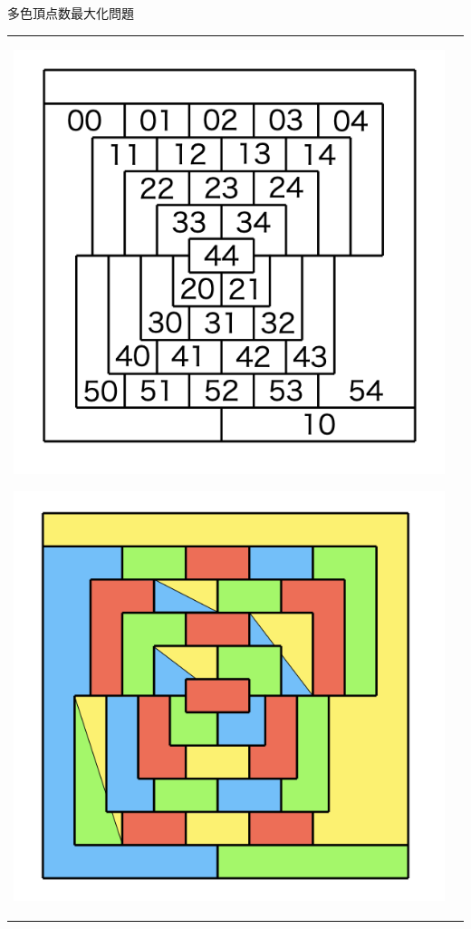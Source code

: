 \documentclass[dvipdfmx,11pt]{beamer}
\begin{document}
\begin{frame}{多色頂点数最大化問題}
 \begin{tabular}{cc}
  \begin{minipage}[t]{0.5\linewidth}
   \centering
   \includegraphics[scale=0.2]{fig/order5.png}
  \end{minipage}
  \begin{minipage}[t]{0.5\linewidth}
   \centering
   \includegraphics[scale=0.2]{fig/order5_mult.png}
  \end{minipage}
 \end{tabular}


\end{frame}
\end{document}

